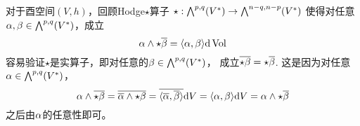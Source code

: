 

对于酉空间$(V,h)$，回顾Hodge$\star$算子
$
  \star:\bigwedge\nolimits^{p,q}(V^*)\to
  \bigwedge\nolimits^{n-q,n-p}(V^*)
$
使得对任意$\alpha,\beta\in\bigwedge\nolimits^{p,q}(V^*)$，成立
$$\alpha\wedge\star\overline{\beta}=\langle \alpha,\beta \rangle\mathrm{d}\operatorname{Vol}$$
容易验证$\star$是实算子，即对任意的$\beta\in\bigwedge\nolimits^{p,q}(V^*)$，
成立$\overline{\star\beta}=\star\overline{\beta}$.
这是因为对任意$\alpha\in\bigwedge\nolimits^{p,q}(V^*)$，
$$
  \alpha\wedge\overline{\star\beta}
=
  \overline{\overline{\alpha}\wedge\star\beta}
=
  \overline{\langle \overline{\alpha},\overline{\beta} \rangle}\mathrm{d} V
=
  \langle \alpha,\beta \rangle\mathrm{d} V
=
  \alpha\wedge\star\overline{\beta}
$$
之后由$\alpha$的任意性即可。

